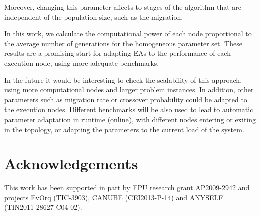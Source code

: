 \documentclass[final,1p,times]{elsarticle}
\begin{document}
Moreover, changing this parameter affects to stages
of the algorithm that are independent of the population size, such as
the migration. 

In this work, we calculate the computational power of each node proportional 
to the average number of generations for the homogeneous parameter set. These results are a promising start for adapting EAs to the
performance of each execution node, using more adequate benchmarks. 

In the future it would be interesting to check the scalability of this
approach, using more computational nodes and larger problem
instances. In addition, other parameters such as migration rate or
crossover probability could be adapted to the execution
nodes. Different benchmarks will be also used to lead to automatic
parameter adaptation in runtime (online), with different nodes entering or
exiting in the topology, or adapting the parameters to the current load of the
system. 

\section*{Acknowledgements}
This work has been supported in part by FPU research grant AP2009-2942 and projects EvOrq (TIC-3903), CANUBE (CEI2013-P-14) and ANYSELF (TIN2011-28627-C04-02).




%
%









\end{document}
